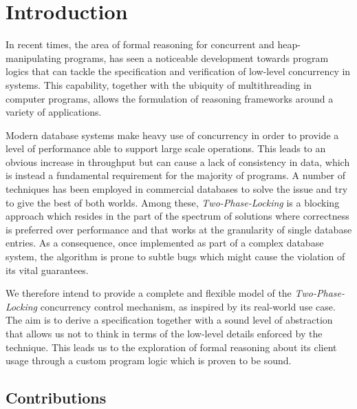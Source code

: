 \section{Introduction}

In recent times, the area of formal reasoning for concurrent and heap-manipulating programs, has seen a noticeable development towards program logics that can tackle the specification and verification of low-level concurrency in systems. This capability, together with the ubiquity of multithreading in computer programs, allows the formulation of reasoning frameworks around a variety of applications.

Modern database systems make heavy use of concurrency in order to provide a level of performance able to support large scale operations. This leads to an obvious increase in throughput but can cause a lack of consistency in data, which is instead a fundamental requirement for the majority of programs. A number of techniques has been employed in commercial databases to solve the issue and try to give the best of both worlds. Among these, \textit{Two-Phase-Locking} is a blocking approach which resides in the part of the spectrum of solutions where correctness is preferred over performance and that works at the granularity of single database entries. As a consequence, once implemented as part of a complex database system, the algorithm is prone to subtle bugs which might cause the violation of its vital guarantees.

We therefore intend to provide a complete and flexible model of the \textit{Two-Phase-Locking} concurrency control mechanism, as inspired by its real-world use case.
The aim is to derive a specification together with a sound level of abstraction that allows us not to think in terms of the low-level details enforced by the technique.
This leads us to the exploration of formal reasoning about its client usage through a custom program logic which is proven to be sound.

\subsection{Contributions}